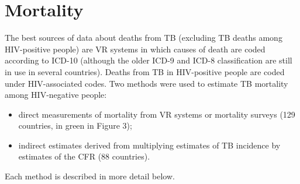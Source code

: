 \section{Mortality}  

The best sources of data about deaths from TB (excluding TB deaths among HIV-positive people) are VR systems in which causes of death are coded according to ICD-10 (although the older ICD-9 and ICD-8 classification are still in use in several countries). Deaths from TB in HIV-positive people are coded under HIV-associated codes.  Two methods were used to estimate TB mortality among HIV-negative people:   

\begin{itemize}
    \item direct measurements of mortality from VR systems or mortality surveys (129 countries, in green in Figure 3);
    \item indirect estimates derived from multiplying estimates of TB incidence by estimates of the CFR (88 countries).
    \end{itemize}  
    
Each method is described in more detail below.  